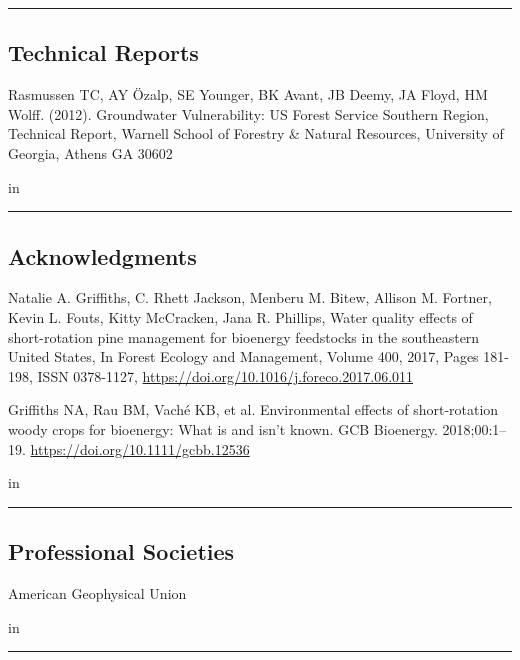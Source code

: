 \documentclass[10pt,letterpaper]{article}
\begin{document}
\hrule
\vspace{-0.4em}
\vskip 0.2in
\subsection*{Technical Reports}

\begin{hangparas}{.25in}{1}
	
	Rasmussen TC, AY \"{O}zalp, SE Younger, BK Avant, JB Deemy, JA Floyd, HM Wolff. (2012). Groundwater Vulnerability: US Forest Service Southern Region, Technical Report, Warnell School of Forestry \& Natural Resources, University of Georgia, Athens GA 30602
	
\end{hangparas}

 in

\hrule
\vspace{-0.4em}
\vskip 0.2in
\subsection*{Acknowledgments}
	
	\begin{hangparas}{.25in}{1}
		
	Natalie A. Griffiths, C. Rhett Jackson, Menberu M. Bitew, Allison M. Fortner, Kevin L. Fouts, Kitty McCracken, Jana R. Phillips, Water quality effects of short-rotation pine management for bioenergy feedstocks in the southeastern United States, In Forest Ecology and Management, Volume 400, 2017, Pages 181-198, ISSN 0378-1127, \url{https://doi.org/10.1016/j.foreco.2017.06.011}
	
	Griffiths NA, Rau BM, Vaché KB, et al. Environmental effects of short‐rotation woody crops for bioenergy: What is and isn’t known. GCB Bioenergy. 2018;00:1–19. \url{https://doi.org/10.1111/gcbb.12536}
	
	\end{hangparas}

 in

\hrule
\vspace{-0.4em}
\vskip 0.2in
\subsection*{Professional Societies}

	American Geophysical Union

 in

\hrule
\vspace{-0.4em}
\vskip 0.2in
\end{document}
